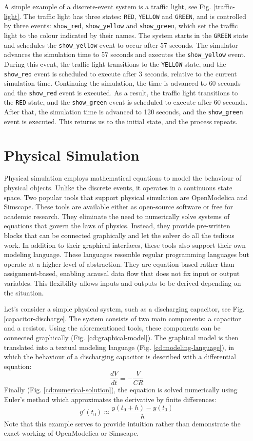 \documentclass[conference]{IEEEtran}
\begin{document}
A simple example of a discrete-event system is a traffic light, see Fig. \ref{traffic-light}.
The traffic light has three states: \texttt{RED}, \texttt{YELLOW} and \texttt{GREEN},
and is controlled by three events: \texttt{show\_red}, \texttt{show\_yellow} and \texttt{show\_green}, which set the traffic light to the colour indicated by their names.
The system starts in the \texttt{GREEN} state and schedules the \texttt{show\_yellow} event to occur after 57 seconds.
The simulator advances the simulation time to 57 seconds and executes the \texttt{show\_yellow} event.
During this event, the traffic light transitions to the \texttt{YELLOW} state, and the \texttt{show\_red} event is scheduled to execute after 3 seconds, relative to the current simulation time.
Continuing the simulation, the time is advanced to 60 seconds and the \texttt{show\_red} event is executed.
As a result, the traffic light transitions to the \texttt{RED} state, and the \texttt{show\_green} event is scheduled to execute after 60 seconds.
After that, the simulation time is advanced to 120 seconds, and the \texttt{show\_green} event is executed.
This returns us to the initial state, and the process repeats.

\section{Physical Simulation}

Physical simulation employs mathematical equations to model the behaviour of physical objects.
Unlike the discrete events, it operates in a continuous state space.
Two popular tools that support physical simulation are OpenModelica and Simscape.
These tools are available either as open-source software or free for academic research.
They eliminate the need to numerically solve systems of equations that govern the laws of physics.
Instead, they provide pre-written blocks that can be connected graphically and let the solver do all the tedious work.
In addition to their graphical interfaces, these tools also support their own modeling language. These languages resemble regular programming languages but operate at a higher level of abstraction.
They are equation-based rather than assignment-based, enabling acausal data flow that does not fix input or output variables.
This flexibility allows inputs and outputs to be derived depending on the situation.

Let's consider a simple physical system, such as a discharging capacitor, see Fig. \ref{capacitor-discharge}.
The system consists of two main components: a capacitor and a resistor.
Using the aforementioned tools, these components can be connected graphically (Fig. \ref{cd:graphical-model}).
The graphical model is then translated into a textual modeling language (Fig. \ref{cd:modeling-language}), in which the behaviour of a discharging capacitor is described with a differential equation:
\[
\frac{dV}{dt} = -\frac{V}{CR}
\]
Finally (Fig. \ref{cd:numerical-solution}), the equation is solved numerically using Euler's method which approximates the derivative by finite differences:
\[
y'(t_0) \approx \frac{y(t_0+h) - y(t_0)}{h}
\]
Note that this example serves to provide intuition rather than demonstrate the exact working of OpenModelica or Simscape.
\end{document}
